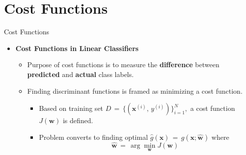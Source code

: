\documentclass[serif, aspectratio=169]{beamer}
\begin{document}
\section{Cost Functions}
\begin{frame}{Cost Functions}
    \begin{itemize}
        \item \textbf{Cost Functions in Linear Classifiers}
        \medskip
        \begin{itemize}\itemsep1em
            \item Purpose of cost functions is to measure the \textbf{difference} between \textbf{predicted} and \textbf{actual} class labels.
            \item Finding discriminant functions is framed as minimizing a cost function.
            \smallskip
            \begin{itemize}\itemsep0.8em
                \item Based on training set \(D \, = \, \{(\mathbf{x}^{(i)},\, y^{(i)})\}^N_{i=1},\) a cost function \(J(\mathbf{w})\) is defined.
                \item Problem converts to finding optimal \(\hat{g}(\mathbf{x}) \, = \, g(\mathbf{x; \hat{w}})\) where \[\mathbf{\hat{w}} \, = \, \arg \min_{\mathbf{w}}J(\mathbf{w})\]
            \end{itemize}
        \end{itemize}
    \end{itemize}
\end{frame}
\end{document}
